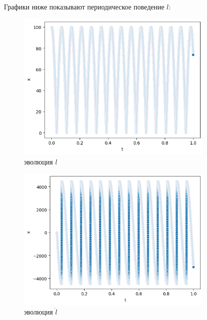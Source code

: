 \documentclass[a4paper, 12pt]{article}
\begin{document}
    Графики ниже показывают периодическое поведение $l$:
 \begin{figure}[H]
  \centering
  \includegraphics[width = 0.85\textwidth, height = 0.20\textheight]{pictures/data/image copy.png}
  \caption{эволюция $l$}
 \end{figure}
    
 \begin{figure}[H]
  \centering
  \includegraphics[width = 0.85\textwidth, height = 0.20\textheight]{pictures/data/image copy 2.png}
  \caption{эволюция $\dot{l}$}
 \end{figure}
    
\end{document}
